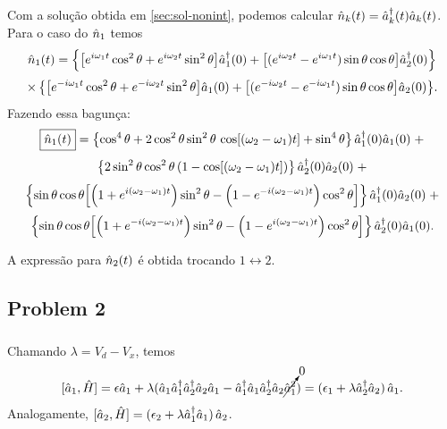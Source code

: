 \documentclass[a4paper,fleqn,12pt]{article}
\begin{document}
Com a solução obtida em \ref{sec:sol-nonint}, podemos calcular $\hat{n}_k(t) = \hat{a}^\dagger_k(t) \hat{a}_k(t)$. Para o caso do $\hat{n}_1$ temos
$$
\hat{n}_1(t) =
\qty{ \qty[e^{i\omega_1 t} \cos^2\theta + e^{i\omega_2 t}\sin^2\theta ] \hat{a}_1^\dagger(0) + \qty[ (e^{i\omega_2 t} - e^{i\omega_1 t}) \sin\theta \cos\theta ] \hat{a}_2^\dagger(0) }
$$
$$
\times \, \qty{ \qty[e^{-i\omega_1 t} \cos^2\theta + e^{-i\omega_2 t}\sin^2\theta ] \hat{a}_1(0) + \qty[ (e^{-i\omega_2 t} - e^{-i\omega_1 t}) \sin\theta \cos\theta ] \hat{a}_2(0) }.
$$
Fazendo essa bagunça:
$$
\boxed{\hat{n}_1(t)} =
\qty{\cos^4\theta + 2 \cos^2\theta \sin^2\theta \, \cos[(\omega_2 - \omega_1)t] + \sin^4\theta} \, \hat{a}^\dagger_1(0) \hat{a}_1(0) \; +
$$
$$
\qty{ 2 \sin^2\theta \cos^2\theta \, (1 - \cos[(\omega_2 - \omega_1) t]) } \, \hat{a}^\dagger_2(0) \hat{a}_2(0) \; +
$$
$$
\qty{ \sin\theta \cos\theta \qty[ \qty(1 + e^{i(\omega_2-\omega_1)t}) \sin^2\theta - \qty(1 - e^{-i(\omega_2-\omega_1)t} ) \cos^2\theta ] } \,
\hat{a}^\dagger_1(0) \hat{a}_2(0) \; +
$$
$$
\qty{ \sin\theta \cos\theta \qty[ \qty(1 + e^{-i(\omega_2-\omega_1)t}) \sin^2\theta - \qty(1 - e^{i(\omega_2-\omega_1)t} ) \cos^2\theta ] } \,
\hat{a}^\dagger_2(0) \hat{a}_1(0).
$$

\n

A expressão para $\hat{n}_2(t)$ é obtida trocando $1 \leftrightarrow 2$.

%

\subsection{Problem 2}

\subsubsection{}

Chamando $\lambda = V_d - V_x$, temos
$$
[\hat{a}_1, \hat{H}] = \epsilon \hat{a}_1 + \lambda (\hat{a}_1 \hat{a}^\dagger_1\hat{a}^\dagger_2 \hat{a}_2 \hat{a}_1  - \hat{a}^\dagger_1 \hat{a}_1 \hat{a}^\dagger_2 \hat{a}_2 \cancelto{0}{\hat{a}_1^2}) =
(\epsilon_1 + \lambda \hat{a}_2^\dagger \hat{a}_2) \, \hat{a}_1.
$$
Analogamente, $[\hat{a}_2, \hat{H}] = (\epsilon_2 + \lambda \hat{a}_1^\dagger \hat{a}_1) \, \hat{a}_2$.
\end{document}
